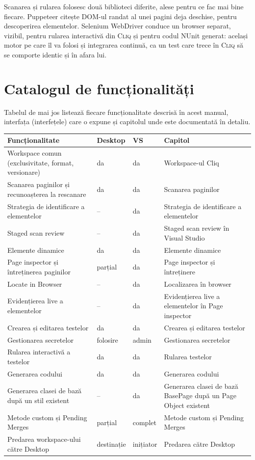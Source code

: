 \documentclass[12pt,a4paper]{report}
\newcommand{\Cliq}{\textsc{Cliq}}
\begin{document}
Scanarea și rularea folosesc două biblioteci diferite, alese pentru ce fac mai bine fiecare. Puppeteer citește DOM-ul randat al unei pagini deja deschise, pentru descoperirea elementelor. Selenium WebDriver conduce un browser separat, vizibil, pentru rularea interactivă din \Cliq{} și pentru codul NUnit generat: același motor pe care îl va folosi și integrarea continuă, ca un test care trece în \Cliq{} să se comporte identic și în afara lui.

\chapter{Catalogul de funcționalități}

Tabelul de mai jos listează fiecare funcționalitate descrisă în acest manual, interfața (interfețele) care o expune și capitolul unde este documentată în detaliu.

\begin{xltabular}{\textwidth}{@{}p{4.3cm}p{2.0cm}p{2.0cm}Y@{}}
\toprule \textbf{Funcționalitate} & \textbf{Desktop} & \textbf{VS} & \textbf{Capitol} \\
\midrule
\endhead
Workspace comun (exclusivitate, format, versionare) & da & da & Workspace-ul Cliq \\
Scanarea paginilor și recunoașterea la rescanare & da & da & Scanarea paginilor \\
Strategia de identificare a elementelor & -- & da & Strategia de identificare a elementelor \\
Staged scan review & -- & da & Staged scan review în Visual Studio \\
Elemente dinamice & da & da & Elemente dinamice \\
Page inspector și întreținerea paginilor & parțial & da & Page inspector și întreținere \\
Locate in Browser & -- & da & Localizarea în browser \\
Evidențierea live a elementelor & -- & da & Evidențierea live a elementelor în Page inspector \\
Crearea și editarea testelor & da & da & Crearea și editarea testelor \\
Gestionarea secretelor & folosire & admin & Gestionarea secretelor \\
Rularea interactivă a testelor & da & da & Rularea testelor \\
Generarea codului & da & da & Generarea codului \\
Generarea clasei de bază după un stil existent & -- & da & Generarea clasei de bază BasePage după un Page Object existent \\
Metode custom și Pending Merges & parțial & complet & Metode custom și Pending Merges \\
Predarea workspace-ului către Desktop & destinație & inițiator & Predarea către Desktop \\
\bottomrule
\end{xltabular}
\end{document}
